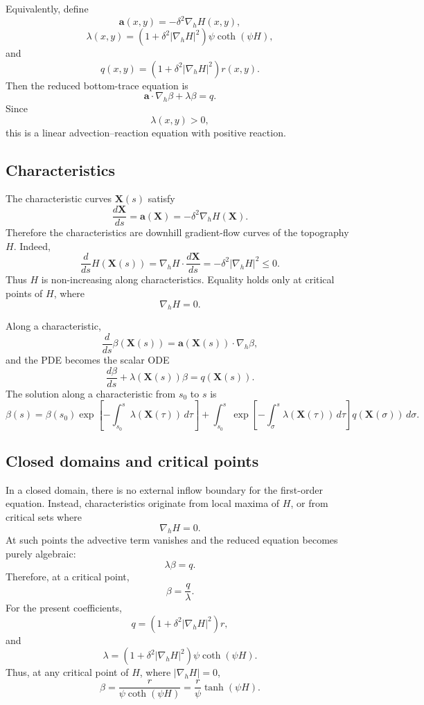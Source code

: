 \documentclass[11pt]{amsart}
\begin{document}
Equivalently, define
\[
\mathbf{a}(x,y)=-\delta^2 \nabla_h H(x,y),
\]
\[
\lambda(x,y)
=
\left(1+\delta^2 |\nabla_h H|^2\right)\psi\coth(\psi H),
\]
and
\[
q(x,y)
=
\left(1+\delta^2 |\nabla_h H|^2\right)r(x,y).
\]
Then the reduced bottom-trace equation is
\[
\boxed{
\mathbf{a}\cdot\nabla_h\beta+\lambda\beta=q.
}
\]
Since
\[
\lambda(x,y)>0,
\]
this is a linear advection--reaction equation with positive reaction.

\subsection{Characteristics}

The characteristic curves \(\mathbf{X}(s)\) satisfy
\[
\frac{d\mathbf{X}}{ds}=\mathbf{a}(\mathbf{X})
=
-\delta^2 \nabla_h H(\mathbf{X}).
\]
Therefore the characteristics are downhill gradient-flow curves of the
topography \(H\). Indeed,
\[
\frac{d}{ds}H(\mathbf{X}(s))
=
\nabla_h H\cdot \frac{d\mathbf{X}}{ds}
=
-\delta^2 |\nabla_h H|^2
\le 0.
\]
Thus \(H\) is non-increasing along characteristics. Equality holds only at
critical points of \(H\), where
\[
\nabla_h H=0.
\]

Along a characteristic,
\[
\frac{d}{ds}\beta(\mathbf{X}(s))
=
\mathbf{a}(\mathbf{X}(s))\cdot\nabla_h\beta,
\]
and the PDE becomes the scalar ODE
\[
\boxed{
\frac{d\beta}{ds}+\lambda(\mathbf{X}(s))\beta
=
q(\mathbf{X}(s)).
}
\]
The solution along a characteristic from \(s_0\) to \(s\) is
\[
\boxed{
\beta(s)
=
\beta(s_0)
\exp\left[
-\int_{s_0}^{s}\lambda(\mathbf{X}(\tau))\,d\tau
\right]
+
\int_{s_0}^{s}
\exp\left[
-\int_{\sigma}^{s}\lambda(\mathbf{X}(\tau))\,d\tau
\right]
q(\mathbf{X}(\sigma))\,d\sigma.
}
\]

\subsection{Closed domains and critical points}

In a closed domain, there is no external inflow boundary for the first-order
equation. Instead, characteristics originate from local maxima of \(H\), or from
critical sets where
\[
\nabla_h H=0.
\]
At such points the advective term vanishes and the reduced equation becomes
purely algebraic:
\[
\lambda\beta=q.
\]
Therefore, at a critical point,
\[
\boxed{
\beta=\frac{q}{\lambda}.
}
\]
For the present coefficients,
\[
q=
\left(1+\delta^2|\nabla_h H|^2\right)r,
\]
and
\[
\lambda=
\left(1+\delta^2|\nabla_h H|^2\right)\psi\coth(\psi H).
\]
Thus, at any critical point of \(H\), where \(|\nabla_h H|=0\),
\[
\boxed{
\beta
=
\frac{r}{\psi\coth(\psi H)}
=
\frac{r}{\psi}\tanh(\psi H).
}
\]
\end{document}
